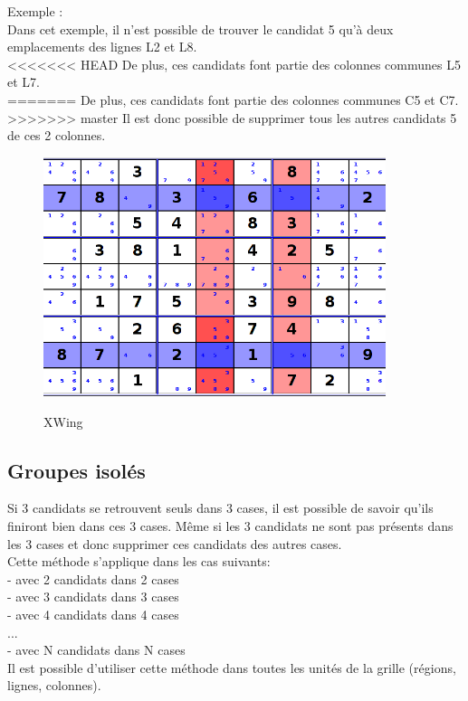 Exemple :\\
Dans cet exemple, il n'est possible de trouver le candidat 5 
qu'à deux emplacements des lignes L2 et L8.\\ 
<<<<<<< HEAD
De plus, ces candidats font partie des colonnes communes L5 et L7.\\ 
=======
De plus, ces candidats font partie des colonnes communes C5 et C7.\\ 
>>>>>>> master
Il est donc possible de supprimer tous les autres candidats 5 de ces 2 colonnes. 

\begin{figure}[ht]
  \caption{\label{annexe5} XWing}
  \includegraphics [width=100mm]{images/XWing.png} \\[0.5cm]
\end{figure}

\newpage

\subsection{Groupes isolés}
Si 3 candidats se retrouvent seuls dans 3 cases, il est possible de savoir qu'ils finiront bien dans ces 3 cases. 
Même si les 3 candidats ne sont pas présents dans les 3 cases et donc supprimer ces candidats des autres cases.
\\
Cette méthode s'applique dans les cas suivants:\\
- avec 2 candidats dans 2 cases\\
- avec 3 candidats dans 3 cases\\
- avec 4 candidats dans 4 cases\\
...\\
- avec N candidats dans N cases\\

Il est possible d'utiliser cette méthode dans toutes les unités de la grille (régions, lignes, colonnes).

